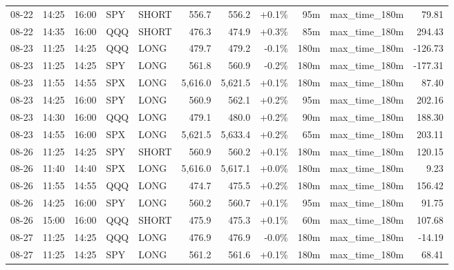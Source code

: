 \documentclass[11pt,a4paper,twoside]{article}
\begin{document}
\begin{center}
\begin{longtable}{>{\color{txtmain}}l l l l l r r r r >{\color{txtmain}}l r}
08-22 & 14:25 & 16:00 & SPY & SHORT & 556.7 & 556.2 & \textcolor{wingreen}{+0.1\%} & 95m & max\_time\_180m & \textcolor{wingreen}{79.81} \\
08-22 & 14:35 & 16:00 & QQQ & SHORT & 476.3 & 474.9 & \textcolor{wingreen}{+0.3\%} & 85m & max\_time\_180m & \textcolor{wingreen}{294.43} \\
08-23 & 11:25 & 14:25 & QQQ & LONG & 479.7 & 479.2 & \textcolor{lossred}{-0.1\%} & 180m & max\_time\_180m & \textcolor{lossred}{-126.73} \\
08-23 & 11:25 & 14:25 & SPY & LONG & 561.8 & 560.9 & \textcolor{lossred}{-0.2\%} & 180m & max\_time\_180m & \textcolor{lossred}{-177.31} \\
08-23 & 11:55 & 14:55 & SPX & LONG & 5,616.0 & 5,621.5 & \textcolor{wingreen}{+0.1\%} & 180m & max\_time\_180m & \textcolor{wingreen}{87.40} \\
08-23 & 14:25 & 16:00 & SPY & LONG & 560.9 & 562.1 & \textcolor{wingreen}{+0.2\%} & 95m & max\_time\_180m & \textcolor{wingreen}{202.16} \\
08-23 & 14:30 & 16:00 & QQQ & LONG & 479.1 & 480.0 & \textcolor{wingreen}{+0.2\%} & 90m & max\_time\_180m & \textcolor{wingreen}{188.30} \\
08-23 & 14:55 & 16:00 & SPX & LONG & 5,621.5 & 5,633.4 & \textcolor{wingreen}{+0.2\%} & 65m & max\_time\_180m & \textcolor{wingreen}{203.11} \\
08-26 & 11:25 & 14:25 & SPY & SHORT & 560.9 & 560.2 & \textcolor{wingreen}{+0.1\%} & 180m & max\_time\_180m & \textcolor{wingreen}{120.15} \\
08-26 & 11:40 & 14:40 & SPX & LONG & 5,616.0 & 5,617.1 & \textcolor{wingreen}{+0.0\%} & 180m & max\_time\_180m & \textcolor{wingreen}{9.23} \\
08-26 & 11:55 & 14:55 & QQQ & LONG & 474.7 & 475.5 & \textcolor{wingreen}{+0.2\%} & 180m & max\_time\_180m & \textcolor{wingreen}{156.42} \\
08-26 & 14:25 & 16:00 & SPY & LONG & 560.2 & 560.7 & \textcolor{wingreen}{+0.1\%} & 95m & max\_time\_180m & \textcolor{wingreen}{91.75} \\
08-26 & 15:00 & 16:00 & QQQ & SHORT & 475.9 & 475.3 & \textcolor{wingreen}{+0.1\%} & 60m & max\_time\_180m & \textcolor{wingreen}{107.68} \\
08-27 & 11:25 & 14:25 & QQQ & LONG & 476.9 & 476.9 & \textcolor{lossred}{-0.0\%} & 180m & max\_time\_180m & \textcolor{lossred}{-14.19} \\
08-27 & 11:25 & 14:25 & SPY & LONG & 561.2 & 561.6 & \textcolor{wingreen}{+0.1\%} & 180m & max\_time\_180m & \textcolor{wingreen}{68.41} \\

\end{longtable}
\end{center}
\end{document}
